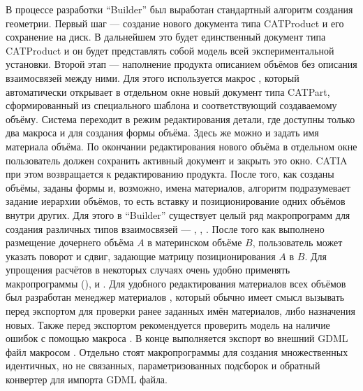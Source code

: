 В процессе разработки ``Builder'' был выработан стандартный алгоритм создания геометрии. Первый шаг --- создание нового документа типа CATProduct и его сохранение на диск. В дальнейшем это будет единственный документ типа CATProduct и он будет представлять собой модель всей экспериментальной установки. Второй этап --- наполнение продукта описанием объёмов без описания взаимосвязей между ними. Для этого используется макрос , который автоматически открывает в отдельном окне новый документ типа CATPart, сформированный из специального шаблона и соответствующий создаваемому объёму. Система переходит в режим редактирования детали, где доступны только два макроса  и  для создания формы объёма. Здесь же можно и задать имя материала объёма. По окончании редактирования нового объёма в отдельном окне пользователь должен сохранить активный документ и закрыть это окно. CATIA при этом возвращается к редактированию продукта. После того, как созданы объёмы, заданы формы и, возможно, имена материалов, алгоритм подразумевает задание иерархии объёмов, то есть вставку и позиционирование одних объёмов внутри других. Для этого в ``Builder'' существует целый ряд макропрограмм для создания различных типов взаимосвязей --- , , . После того как выполнено размещение дочернего объёма $A$ в материнском объёме $B$, пользователь может указать поворот и сдвиг, задающие матрицу позиционирования $A$ в $B$. Для упрощения расчётов в некоторых случаях очень удобно применять макропрограммы  (),  и . Для удобного редактирования материалов всех объёмов был разработан менеджер материалов , который обычно имеет смысл вызывать перед экспортом для проверки ранее заданных имён материалов, либо назначения новых. Также перед экспортом рекомендуется проверить модель на наличие ошибок с помощью макроса . В конце выполняется экспорт во внешний GDML файл макросом . Отдельно стоят макропрограммы  для создания множественных идентичных, но не связанных, параметризованных подсборок и обратный конвертер  для импорта GDML файла.

%                                                                   

